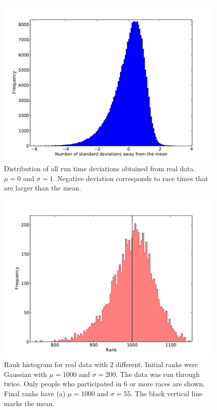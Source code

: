 \begin{figure}[h]     
    \begin{center}                        
        \includegraphics[width=15cm]{./images/timeDeviationDistribution.pdf}
	\end{center}
	\caption{Distribution of all run time deviations obtained from real data. $\mu=0$ and $\sigma=1$. Negative deviation corresponds to race times that are larger than the mean.}
	\label{fig:timeDeviationDistribution}
\end{figure}
\begin{figure}[h]     
    \begin{center}                        
        \includegraphics[width=15cm]{./images/simpleRealData.pdf}
	\end{center}
	\caption{Rank histogram for real data with 2 different. Initial ranks were Gaussian with $\mu=1000$ and $\sigma=200$. The data was run through twice. Only people who participated in 6 or more races are shown. Final ranks have (a) $\mu=1000$ and $\sigma=55$. The black vertical line marks the mean.}
	\label{fig:simpleRealData}
\end{figure}
